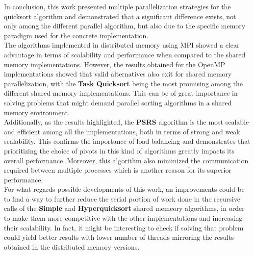 \documentclass[../main.tex]{subfiles}
\begin{document}
In conclusion, this work presented multiple parallelization strategies for the quicksort algorithm and demonstrated that a significant difference exists, not only among the different parallel algorithm, but also due to the specific memory paradigm used for the concrete implementation.\\
The algorithms implemented in distributed memory using MPI showed a clear advantage in terms of scalability and performance when compared to the shared memory implementations. However, the results obtained for the OpenMP implementations showed that valid alternatives also exit for shared memory parallelization, with the \textbf{Task Quicksort} being the most promising among the different shared memory implementations. This can be of great importance in solving problems that might demand parallel sorting algorithms in a shared memory environment.\\
Additionally, as the results highlighted, the \textbf{PSRS} algorithm is the most scalable and efficient among all the implementations, both in terms of strong and weak scalability. This confirms the importance of load balancing and demonstrates that prioritizing the choice of pivots in this kind of algorithms greatly impacts its overall performance. Moreover, this algorithm also minimized the communication required between multiple processes which is another reason for its superior performance.\\
For what regards possible developments of this work, an improvements could be to find a way to further reduce the serial portion of work done in the recursive calls of the \textbf{Simple} and \textbf{Hyperquicksort} shared memeory algorithms, in order to make them more competitive with the other implementations and increasing their scalability. In fact, it might be interesting to check if solving that problem could yield better results with lower number of threads mirroring the results obtained in the distributed memory versions.\\ 
\end{document}
